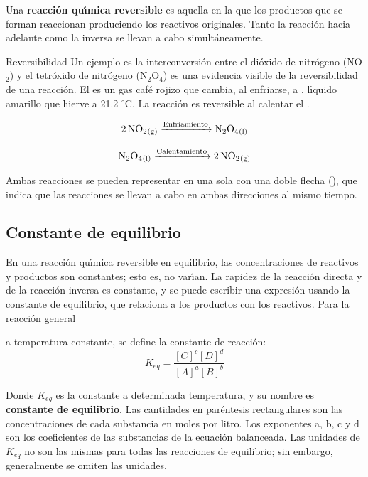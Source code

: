 Una \textbf{reacci\'on qu\'{\i}mica reversible}
 es aquella en la que los productos que se forman reaccionan produciendo los reactivos originales. Tanto la reacci\'on hacia adelante como la inversa se llevan a cabo
simult\'aneamente.

\begin{ejemplo}{Reversibilidad}
Un ejemplo es la interconversi\'on entre el di\'oxido de nitr\'ogeno (NO$_2$) y el tetr\'oxido de nitr\'ogeno (N$_2$O$_4$) es una evidencia visible de la reversibilidad de una reacci\'on. El  es un gas caf\'e rojizo que cambia, al enfriarse, a , l\'{\i}quido amarillo que hierve a 21.2 $^\circ$C. La reacci\'on es reversible al
calentar el .

$$\ce{2NO2_{(g)} ->[\text{Enfriamiento}] N2O4_{(l)}}$$

$$ \ce{N2O4_{(l)} ->[\text{Calentamiento}] 2NO2_{(g)}} $$

Ambas reacciones se pueden  representar en una sola con una doble flecha (\ce{<-->}), que indica que las reacciones se llevan a cabo en ambas direcciones al  mismo tiempo.

\begin{center}
\end{center} 
\end{ejemplo}

\subsection{Constante de equilibrio}
En una reacci\'on qu\'{\i}mica reversible en equilibrio, las  concentraciones de reactivos y productos son constantes; esto es, no var\'{\i}an. La rapidez de la reacci\'on  directa y de la reacci\'on inversa es constante, y se puede escribir una expresi\'on  usando la constante de equilibrio, que relaciona a los productos con los reactivos. Para la reacci\'on general
\begin{center}
\end{center}
a temperatura constante, se define la constante de reacci\'on:
\begin{equation}
K_{eq} = \frac{[C]^c[D]^d} {[A]^a [B]^b}
\end{equation}

Donde $K_{eq}$ es la constante a determinada temperatura, y su nombre es \textbf{constante de equilibrio}. Las cantidades en par\'entesis rectangulares son las concentraciones de cada substancia en moles por litro. Los exponentes a, b, c y d son los coeficientes de las substancias de la ecuaci\'on balanceada. Las unidades de $K_{eq}$ no son las mismas para todas las reacciones de equilibrio; sin embargo, generalmente se omiten las unidades.

